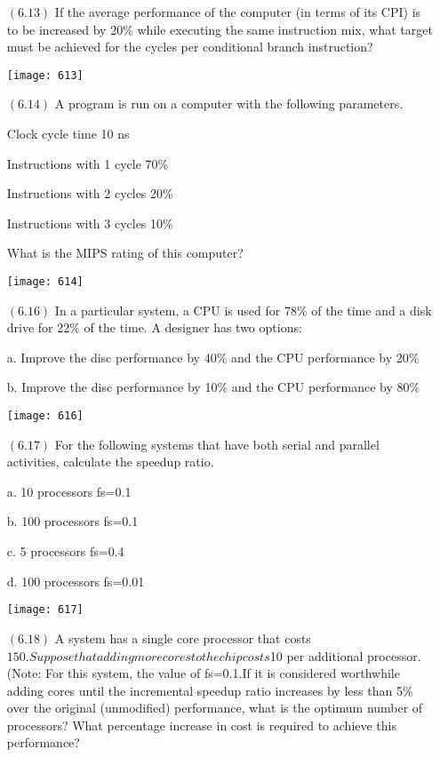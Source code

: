 \documentclass[letterpaper,10pt,titlepage]{article}
\begin{document}
\begin{enumerate}
\item[$(6.13)$] If the average performance of the computer (in terms of its CPI) is to be increased by 20\% while executing the same instruction mix, what target must be achieved for the cycles per conditional branch instruction?

\begin{center}
\texttt{[image: 613]}
\end{center}


\item[$(6.14)$] A program is run on a computer with the following parameters.

Clock cycle time 10 ns

Instructions with 1 cycle 70\%

Instructions with 2 cycles 20\%

Instructions with 3 cycles 10\% 

What is the MIPS rating of this computer?

\begin{center}
\texttt{[image: 614]}
\end{center}


\item[$(6.16)$] In a particular system, a CPU is used for 78\% of the time and a disk drive for 22\% of the time. A designer has two options: 

a. Improve the disc performance by 40\% and the CPU performance by 20\%

b. Improve the disc performance by 10\% and the CPU performance by 80\%

\begin{center}
\texttt{[image: 616]}
\end{center}


\item[$(6.17)$] For the following systems that have both serial and parallel activities, calculate the speedup ratio. 

a. 10 processors fs=0.1

b. 100 processors fs=0.1

c. 5 processors fs=0.4

d. 100 processors fs=0.01

\begin{center}
\texttt{[image: 617]}
\end{center}


\item[$(6.18)$] A system has a single core processor that costs $150. Suppose that adding more cores to the chip costs $10 per additional processor. (Note: For this system, the value of fs=0.1.If it is considered worthwhile adding cores until the incremental speedup ratio increases by less than 5\% over the original (unmodified) performance, what is the optimum number of processors? What percentage increase in cost is required to achieve this performance?


\end{enumerate}
\end{document}
